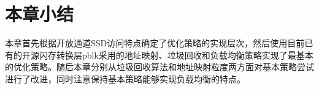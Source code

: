 



\section{本章小结}
本章首先根据开放通道SSD访问特点确定了优化策略的实现层次，然后使用目前已有的开源闪存转换层pblk采用的地址映射、垃圾回收和负载均衡策略实现了最基本的优化策略。随后本章分别从垃圾回收算法和地址映射粒度两方面对基本策略尝试进行了改进，同时注意保持基本策略能够实现负载均衡的特点。